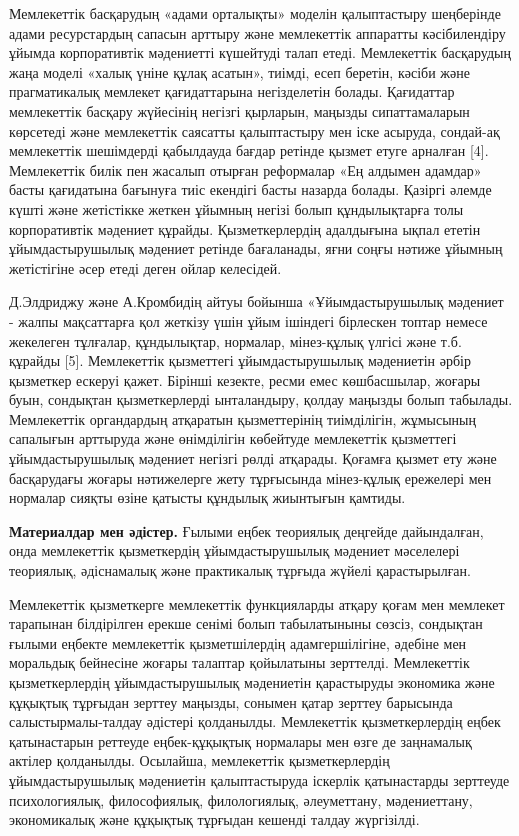 Мемлекеттік басқарудың «адами орталықты» моделін қалыптастыру шеңберінде
адами ресурстардың сапасын арттыру және мемлекеттік аппаратты
кәсібилендіру ұйымда корпоративтік мәдениетті күшейтуді талап етеді.
Мемлекеттік басқарудың жаңа моделі «халық үніне құлақ асатын», тиімді,
есеп беретін, кәсіби және прагматикалық мемлекет қағидаттарына
негізделетін болады. Қағидаттар мемлекеттік басқару жүйесінің негізгі
қырларын, маңызды сипаттамаларын көрсетеді және мемлекеттік саясатты
қалыптастыру мен іске асыруда, сондай-ақ мемлекеттік шешімдерді
қабылдауда бағдар ретінде қызмет етуге арналған {[}4{]}. Мемлекеттік
билік пен жасалып отырған реформалар «Ең алдымен адамдар» басты
қағидатына бағынуға тиіс екендігі басты назарда болады. Қазіргі әлемде
күшті және жетістікке жеткен ұйымның негізі болып құндылықтарға толы
корпоративтік мәдениет құрайды. Қызметкерлердің адалдығына ықпал ететін
ұйымдастырушылық мәдениет ретінде бағаланады, яғни соңғы нәтиже ұйымның
жетістігіне әсер етеді деген ойлар келесідей.

Д.Элдриджу және А.Кромбидің айтуы бойынша «Ұйымдастырушылық мәдениет -
жалпы мақсаттарға қол жеткізу үшін ұйым ішіндегі бірлескен топтар немесе
жекелеген тұлғалар, құндылықтар, нормалар, мінез-құлық үлгісі және т.б.
құрайды {[}5{]}. Мемлекеттік қызметтегі ұйымдастырушылық мәдениетін
әрбір қызметкер ескеруі қажет. Бірінші кезекте, ресми емес көшбасшылар,
жоғары буын, сондықтан қызметкерлерді ынталандыру, қолдау маңызды болып
табылады. Мемлекеттік органдардың атқаратын қызметтерінің тиімділігін,
жұмысының сапалығын арттыруда және өнімділігін көбейтуде мемлекеттік
қызметтегі ұйымдастырушылық мәдениет негізгі рөлді атқарады. Қоғамға
қызмет ету және басқарудағы жоғары нәтижелерге жету тұрғысында
мінез-құлық ережелері мен нормалар сияқты өзіне қатысты құндылық
жиынтығын қамтиды.

{\bfseries Материалдар мен әдістер.} Ғылыми еңбек теориялық деңгейде
дайындалған, онда мемлекеттік қызметкердің ұйымдастырушылық мәдениет
мәселелері теориялық, әдіснамалық және практикалық тұрғыда жүйелі
қарастырылған.

Мемлекеттік қызметкерге мемлекеттік функцияларды атқару қоғам мен
мемлекет тарапынан білдірілген ерекше сенімі болып табылатыныны сөзсіз,
сондықтан ғылыми еңбекте мемлекеттік қызметшілердің адамгершілігіне,
әдебіне мен моральдық бейнесіне жоғары талаптар қойылатыны зерттелді.
Мемлекеттік қызметкерлердің ұйымдастырушылық мәдениетін қарастыруды
экономика және құқықтық тұрғыдан зерттеу маңызды, сонымен қатар зерттеу
барысында салыстырмалы-талдау әдістері қолданылды. Мемлекеттік
қызметкерлердің еңбек қатынастарын реттеуде еңбек-құқықтық нормалары мен
өзге де заңнамалық актілер қолданылды. Осылайша, мемлекеттік
қызметкерлердің ұйымдастырушылық мәдениетін қалыптастыруда іскерлік
қатынастарды зерттеуде психологиялық, философиялық, филологиялық,
әлеуметтану, мәдениеттану, экономикалық және құқықтық тұрғыдан кешенді
талдау жүргізілді.

